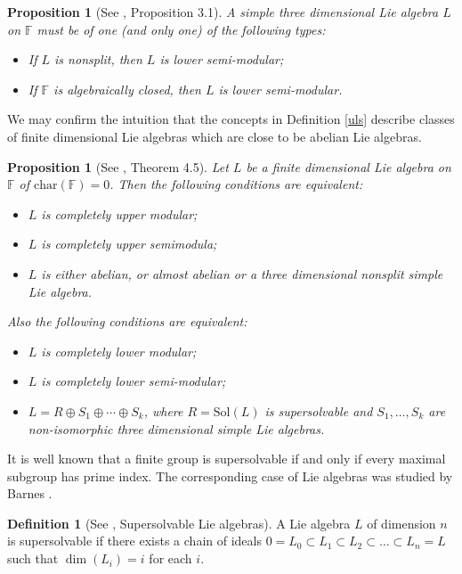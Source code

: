 \documentclass{amsart}
\newtheorem{proposition}[theorem]{Proposition}
\theoremstyle{definition}
\newtheorem{definition}[theorem]{Definition}
\numberwithin{equation}{section}
\begin{document}
\begin{proposition}[See \cite{kolman1965}, Proposition 3.1]  A simple three dimensional Lie algebra $L$ on $\mathbb{F}$ must be of one (and only one) of the following types:
\begin{itemize}
    \item [(i).] If $L$ is nonsplit, then $L$ is lower semi-modular;
    \item [(ii).] If $\mathbb{F}$ is algebraically closed, then $L$ is lower semi-modular.
\end{itemize}
\end{proposition}

We may confirm the intuition that the concepts  in Definition \ref{uls} describe classes of finite dimensional Lie algebras which are close to be abelian Lie algebras.

\begin{proposition}[See \cite{boto}, Theorem 4.5] \label{classificationusm} Let $L$ be a finite dimensional Lie algebra on $\mathbb{F}$ of $\mathrm{char}(\mathbb{F})=0$. Then the following  conditions are equivalent:
 \begin{itemize}
     \item [(i).]  $L$ is completely upper modular; 
     \item [(ii).] $L$ is completely upper semimodula;
     \item [(iii).] $L$ is either abelian, or almost abelian or a three dimensional nonsplit simple Lie algebra.
 \end{itemize}
Also the following  conditions are equivalent:
  \begin{itemize}
     \item [(i).]  $L$ is completely lower modular;
     \item [(ii).] $L$ is completely lower semi-modular;
     \item [(iii).] $L=R \oplus S_1 \oplus \cdots \oplus S_k$, where $R=\mathrm{Sol}(L)$ is supersolvable and  $S_1, \ldots, S_k$  are non-isomorphic three dimensional simple Lie algebras.
 \end{itemize}
\end{proposition}

It is well known that a finite group is supersolvable if and only if every maximal subgroup has prime index. The corresponding case of Lie algebras was studied by Barnes  \cite[Theorem 7]{barnes1967}.  

\begin{definition}[See \cite{barnes1967}, Supersolvable Lie algebras] 
 A Lie algebra $L$ of dimension $n$ is supersolvable if there exists a chain of ideals \(0 = L_0 \subset L_1 \subset L_2 \subset \dots \subset L_n = L\) such that \(\dim(L_i) = i\) for each $i$.
\end{definition}
\end{document}

